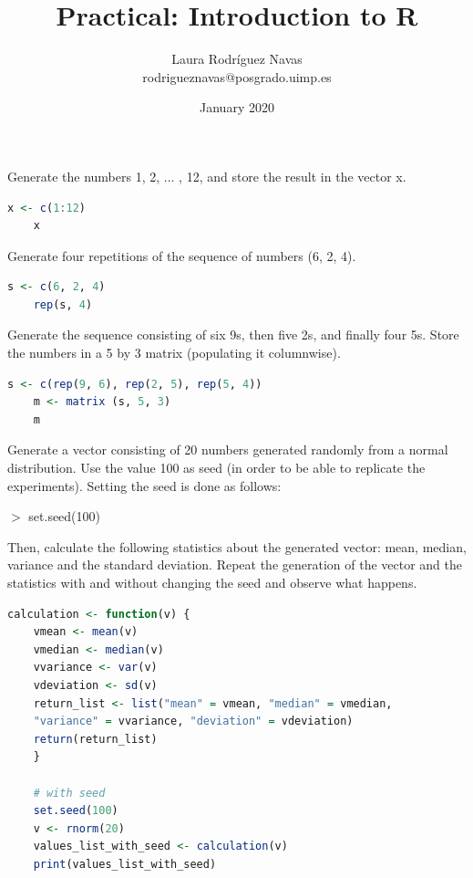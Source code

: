 \documentclass{exam}
\title{Practical: Introduction to R}
\author{Laura Rodríguez Navas \\ rodrigueznavas@posgrado.uimp.es}
\date{January 2020}
\begin{document}
	
	\maketitle

\begin{questions}
    
    \question Generate the numbers 1, 2, ... , 12, and store the result in the vector x.    
     \begin{lstlisting}[language=R, numbersep=0pt, resetmargins=true, basicstyle=\small]
   	x <- c(1:12)
   	x
    \end{lstlisting}
  
    \question Generate four repetitions of the sequence of numbers (6, 2, 4).    
     \begin{lstlisting}[language=R, numbersep=0pt, resetmargins=true, basicstyle=\small]
	s <- c(6, 2, 4)
	rep(s, 4)
    \end{lstlisting}
    
    \question Generate the sequence consisting of six 9s, then five 2s, and finally four 5s. Store the numbers in a 5 by 3 matrix (populating it columnwise).    
     \begin{lstlisting}[language=R, numbersep=0pt, resetmargins=true, basicstyle=\small]
   	s <- c(rep(9, 6), rep(2, 5), rep(5, 4))
   	m <- matrix (s, 5, 3)
   	m
    \end{lstlisting}
    
    \question Generate a vector consisting of 20 numbers generated randomly from a normal distribution. Use the value 100 as seed (in order to be able to replicate the experiments). Setting the seed is done as follows: 
    
    $>$ set.seed(100)
    
    Then, calculate the following statistics about the generated vector: mean, median, variance and the standard deviation. Repeat the generation of the vector and the statistics with and without changing the seed and observe what happens. 
    
     \begin{lstlisting}[language=R, numbersep=0pt, resetmargins=true, basicstyle=\small]
    calculation <- function(v) {
    vmean <- mean(v)
    vmedian <- median(v)
    vvariance <- var(v)
    vdeviation <- sd(v)
    return_list <- list("mean" = vmean, "median" = vmedian, 
    "variance" = vvariance, "deviation" = vdeviation)
    return(return_list)
    }
      
    # with seed    
    set.seed(100)
    v <- rnorm(20)
    values_list_with_seed <- calculation(v)
    print(values_list_with_seed)
    

\end{lstlisting}
\end{questions}
\end{document}
